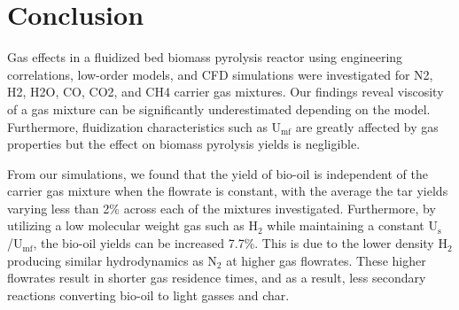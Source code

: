 
\section{Conclusion}

Gas effects in a fluidized bed biomass pyrolysis reactor using engineering correlations, low-order models, and CFD simulations were investigated for N2, H2, H2O, CO, CO2, and CH4 carrier gas mixtures. Our findings reveal viscosity of a gas mixture can be significantly underestimated depending on the model. Furthermore, fluidization characteristics such as U$_\text{mf}$ are greatly affected by gas properties but the effect on biomass pyrolysis yields is negligible.

From our simulations, we found that the yield of bio-oil is independent of the carrier gas mixture when the flowrate is constant, with the average the tar yields varying less than 2\% across each of the mixtures investigated. Furthermore, by utilizing a low molecular weight gas such as H$_2$ while maintaining a constant U$_\text{s}$/U$_\text{mf}$, the bio-oil yields can be increased 7.7\%. This is due to the lower density H$_2$ producing similar hydrodynamics as N$_2$ at higher gas flowrates. These higher flowrates result in shorter gas residence times, and as a result, less secondary reactions converting bio-oil to light gasses and char.   
